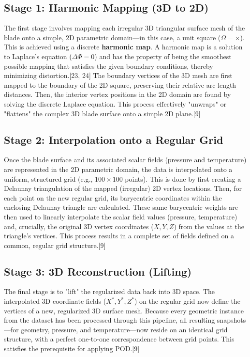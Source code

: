 \documentclass[12pt, a4paper]{report}
\begin{document}
\subsection{Stage 1: Harmonic Mapping (3D to 2D)}
The first stage involves mapping each irregular 3D triangular surface mesh of the blade onto a simple, 2D parametric domain—in this case, a unit square ($\Omega =  \times $). This is achieved using a discrete \textbf{harmonic map}. A harmonic map is a solution to Laplace's equation ($\Delta \Phi = 0$) and has the property of being the smoothest possible mapping that satisfies the given boundary conditions, thereby minimizing distortion.[23, 24] The boundary vertices of the 3D mesh are first mapped to the boundary of the 2D square, preserving their relative arc-length distances. Then, the interior vertex positions in the 2D domain are found by solving the discrete Laplace equation. This process effectively "unwraps" or "flattens" the complex 3D blade surface onto a simple 2D plane.[9]

\subsection{Stage 2: Interpolation onto a Regular Grid}
Once the blade surface and its associated scalar fields (pressure and temperature) are represented in the 2D parametric domain, the data is interpolated onto a uniform, structured grid (e.g., $100 \times 100$ points). This is done by first creating a Delaunay triangulation of the mapped (irregular) 2D vertex locations. Then, for each point on the new regular grid, its barycentric coordinates within the enclosing Delaunay triangle are calculated. These same barycentric weights are then used to linearly interpolate the scalar field values (pressure, temperature) and, crucially, the original 3D vertex coordinates ($X, Y, Z$) from the values at the triangle's vertices. This process results in a complete set of fields defined on a common, regular grid structure.[9]

\subsection{Stage 3: 3D Reconstruction (Lifting)}
The final stage is to "lift" the regularized data back into 3D space. The interpolated 3D coordinate fields ($X^*, Y^*, Z^*$) on the regular grid now define the vertices of a new, regularized 3D surface mesh. Because every geometric instance from the dataset has been processed through this pipeline, all resulting snapshots—for geometry, pressure, and temperature—now reside on an identical grid structure, with a perfect one-to-one correspondence between grid points. This satisfies the prerequisite for applying POD.[9]
\end{document}
